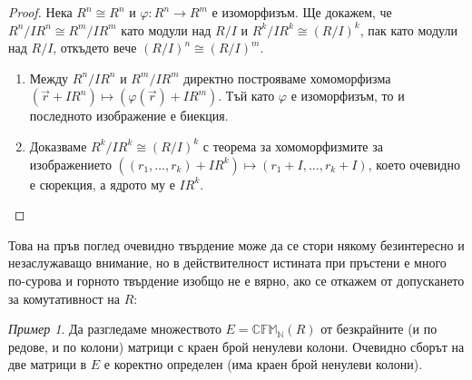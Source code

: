 \documentclass{article}
\newif\ifusemulticols
\theoremstyle{definition}
\theoremstyle{remark}
\newtheorem{example}{Пример}[section]
\theoremstyle{plain}
\theoremstyle{plain}
\newenvironment{mymulticols}
    { \ifusemulticols \begin{multicols}{2} \fi }
    { \ifusemulticols \end{multicols} \fi }
\begin{document}
\begin{mymulticols}
\begin{proof}
    Нека $R^{n}\cong R^{n}$ и $\varphi:R^{n}\to R^{m}$
    е изоморфизъм. Ще докажем, че ${R^{n}}/{IR^{n}}\cong{R^{m}}/{IR^{m}}$
    като модули над $R/I$ и ${R^{k}}/{IR^{k}}\cong\left({R}/{I}\right)^{k}$,
    пак като модули над $R/I$, откъдето вече $\left({R}/{I}\right)^{n}\cong\left({R}/{I}\right)^{m}$.
    \begin{enumerate}
        \item Между ${R^{n}}/{IR^{n}}\text{ и }{R^{m}}/{IR^{m}}$ директно
            построяваме хомоморфизма $(\vec{r}+IR^{n})\mapsto(\varphi(\vec{r})+IR^{m})$.
            Тъй като $\varphi$ е изоморфизъм, то и последното изображение е биекция.
        \item Доказваме ${R^{k}}/{IR^{k}}\cong\left({R}/{I}\right)^{k}$
            с теорема за хомоморфизмите за изображението $\left(\left(r_{1},\ldots,r_{k}\right)+IR^{k}\right)\mapsto\left(r_{1}+I,\ldots,r_{k}+I\right)$,
            което очевидно е сюрекция, а ядрото му е $IR^{k}$.
    \end{enumerate}

\end{proof}

Това на пръв поглед очевидно твърдение може да се стори някому безинтересно и незаслужаващо
внимание, но в действителност истината при пръстени е много по-сурова и горното твърдение изобщо не
е вярно, ако се откажем от допускането за комутативност на $R$:

\begin{example}
    \label{example:rank_annomaly}
    Да разгледаме множеството $E = \mathbb{CFM_N}(R)$ от безкрайните (и по редове, и по колони)
    матрици с краен брой ненулеви колони. Очевидно сборът на две матрици в $E$ е коректно определен
    (има краен брой ненулеви колони).


\end{example}
\end{mymulticols}
\end{document}
